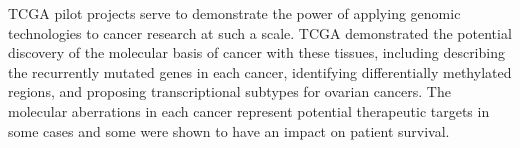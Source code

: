 \acrlong{TCGA} pilot projects \citep{TCGA2008GBM, TCGA2011OV, TCGA2012LUSC} serve to demonstrate the power of applying \gls{genomic} technologies to cancer research at such a scale. \gls{TCGA} demonstrated the potential discovery of the molecular basis of cancer with these tissues, including describing the recurrently mutated genes in each cancer, identifying differentially methylated regions, and proposing transcriptional subtypes for ovarian cancers. The molecular aberrations in each cancer represent potential therapeutic targets in some cases and some were shown to have an impact on patient survival.


